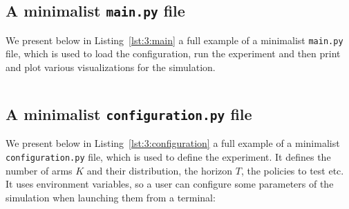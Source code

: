 \begin{small}
    \inputminted[linenos=true,numbersep=5pt,frame=lines,framesep=2mm]{python3}{2-Chapters/3-Chapter/src/example_of_use_of_SMPyBandits.py}
\end{small}


\subsection{A minimalist \texttt{main.py} file}

We present below in Listing~\ref{lst:3:main} a full example of a minimalist \texttt{main.py} file,
which is used to load the configuration, run the experiment and then print and plot various visualizations for the simulation.

\begin{small}
    \inputminted[linenos=true,numbersep=5pt,frame=lines,framesep=2mm]{python3}{2-Chapters/3-Chapter/src/example_of_main_singleplayer.py}
\end{small}


\subsection{A minimalist \texttt{configuration.py} file}

We present below in Listing~\ref{lst:3:configuration} a full example of a minimalist \texttt{configuration.py} file,
which is used to define the experiment.
It defines the number of arms $K$ and their distribution, the horizon $T$, the policies to test etc.
It uses environment variables, so a user can configure some parameters of the simulation when launching them from a terminal:


